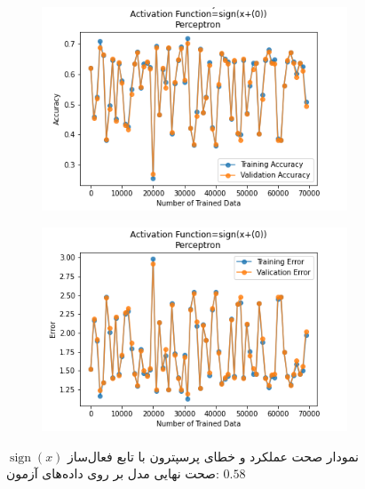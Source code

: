 \documentclass[12pt, a4paper]{article}
\DeclareMathOperator{\sign}{sign}
\begin{document}
\begin{figure}[h]
    \begin{subfigure}{0.45\linewidth}
        \centering
        \includegraphics[width=\linewidth]{images/5/perceptron/activation_func/1.png}
    \end{subfigure}
    \hfil
    \begin{subfigure}{0.45\linewidth}
        \centering
        \includegraphics[width=\linewidth]{images/5/perceptron/activation_func/2.png}
    \end{subfigure}
    \caption{نمودار صحت عملکرد‌ و خطای پرسپترون با تابع فعال‌ساز $\sign(x)$
    \newline
    صحت نهایی مدل بر روی داده‌های آزمون: $0.58$}
\end{figure}
\end{document}
